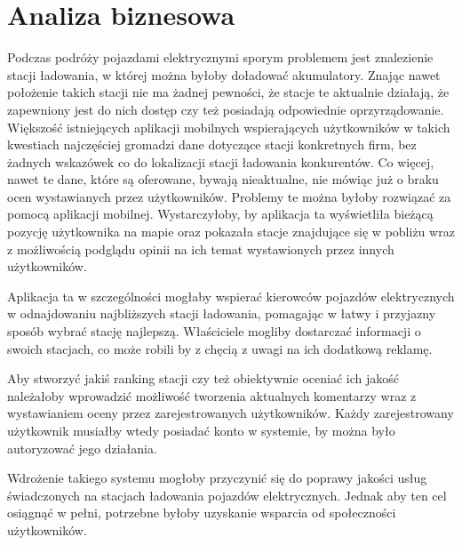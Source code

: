 \section{Analiza biznesowa}
Podczas podróży pojazdami elektrycznymi sporym problemem jest znalezienie stacji ładowania, w której można byłoby doładować akumulatory. Znając nawet położenie takich stacji nie ma żadnej pewności, że stacje te aktualnie działają, że zapewniony jest do nich dostęp czy też posiadają odpowiednie oprzyrządowanie. Większość istniejących aplikacji mobilnych wspierających użytkowników w takich kwestiach najczęściej gromadzi dane dotyczące stacji konkretnych firm, bez żadnych wskazówek co do lokalizacji stacji ładowania konkurentów. Co więcej, nawet te dane, które są oferowane, bywają nieaktualne, nie mówiąc już o braku ocen wystawianych przez użytkowników. Problemy te można byłoby rozwiązać za pomocą aplikacji mobilnej. Wystarczyłoby, by aplikacja ta wyświetliła bieżącą pozycję użytkownika na mapie oraz pokazała stacje znajdujące się w pobliżu wraz z możliwością podglądu opinii na ich temat wystawionych przez innych użytkowników.

Aplikacja ta w szczególności mogłaby wspierać kierowców pojazdów elektrycznych w odnajdowaniu najbliższych stacji ładowania, pomagając w łatwy i przyjazny sposób wybrać stację najlepszą. Właściciele mogliby dostarczać informacji o swoich stacjach, co może robili by z chęcią z uwagi na ich dodatkową reklamę.

Aby stworzyć jakiś ranking stacji czy też obiektywnie oceniać ich jakość należałoby wprowadzić możliwość tworzenia aktualnych komentarzy wraz z wystawianiem oceny przez zarejestrowanych użytkowników. Każdy zarejestrowany użytkownik musiałby wtedy posiadać konto w systemie, by można było autoryzować jego działania.

Wdrożenie takiego systemu mogłoby przyczynić się do poprawy jakości usług świadczonych na stacjach ładowania pojazdów elektrycznych.
Jednak aby ten cel osiągnąć w pełni, potrzebne byłoby uzyskanie wsparcia od społeczności użytkowników.

